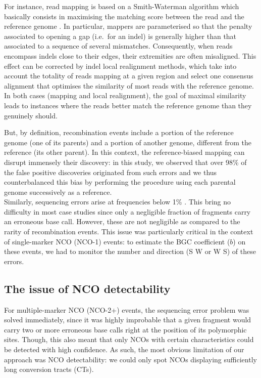 For instance, read mapping is based on a Smith-Waterman algorithm which basically consists in maximising the matching score between the read and the reference genome \citep{smith1981identification}.
In particular, mappers are parameterised so that the penalty associated to opening a gap (i.e.\ for an indel) is generally higher than that associated to a sequence of several mismatches.
Consequently, when reads encompass indels close to their edges, their extremities are often misaligned.
This effect can be corrected by indel local realignment methods, which take into account the totality of reads mapping at a given region and select one consensus alignment that optimises the similarity of most reads with the reference genome.
In both cases (mapping and local realignment), the goal of maximal similarity leads to instances where the reads better match the reference genome than they genuinely should.

But, by definition, recombination events include a portion of the reference genome (one of its parents) and a portion of another genome, different from the reference (its other parent).
In this context, the reference-biased mapping can disrupt immensely their discovery: in this study, we observed that over 98\% of the false positive discoveries originated from such errors and we thus counterbalanced this bias by performing the procedure using each parental genome successively as a reference.\\

Similarly, sequencing errors arise at frequencies below 1\% \citep{fox2014accuracy,pfeiffer2018systematic}.
This bring no difficulty in most case studies since only a negligible fraction of fragments carry an erroneous base call.
However, these are not negligible as compared to the rarity of recombination events.
This issue was particularly critical in the context of single-marker NCO (NCO-1) events:
to estimate the BGC coefficient ($b$) on these events, we had to monitor the number and direction (S\textrightarrow{} W or W\textrightarrow{} S) of these errors.




\subsection{The issue of NCO detectability}

For multiple-marker NCO (NCO-2+) events, the sequencing error problem was solved immediately, since it was highly improbable that a given fragment would carry two or more erroneous base calls right at the position of its polymorphic sites.
Though, this also meant that only NCOs with certain characteristics could be detected with high confidence.
As such, the most obvious limitation of our approach was NCO detectability: we could only spot NCOs displaying sufficiently long conversion tracts (CTs).

